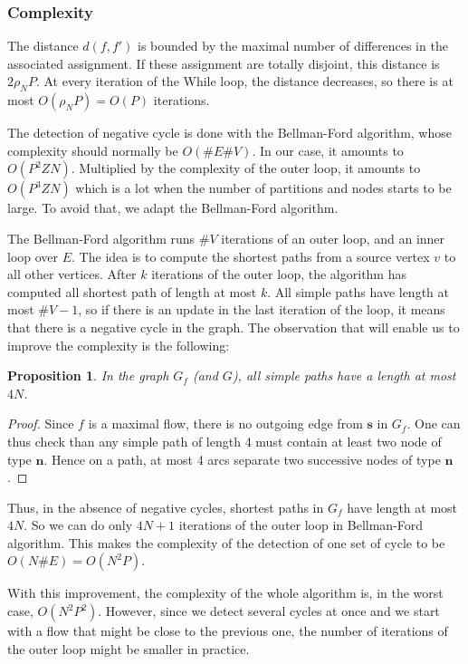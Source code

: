 \documentclass[]{article}
\newtheorem{proposition}{Proposition}
\begin{document}
\subsubsection*{Complexity}
The distance $d(f,f')$ is bounded by the maximal number of differences in the associated assignment. If these assignment are totally disjoint, this distance is $2\rho_N P$. At every iteration of the While loop, the distance decreases, so there is at most $O(\rho_N P) = O(P)$ iterations.

The detection of negative cycle is done with the Bellman-Ford algorithm, whose complexity should normally be $O(\#E\#V)$. In our case, it amounts to $O(P^2ZN)$. Multiplied by the complexity of the outer loop, it amounts to $O(P^3ZN)$ which is a lot when the number of partitions and nodes starts to be large. To avoid that, we adapt the Bellman-Ford algorithm.

The Bellman-Ford algorithm runs $\#V$ iterations of an outer loop, and an inner loop over $E$. The idea is to compute the shortest paths from a source vertex $v$ to all other vertices. After $k$ iterations of the outer loop, the algorithm has computed all shortest path of length at most $k$. All simple paths have length at most $\#V-1$, so if there is an update in the last iteration of the loop, it means that there is a negative cycle in the graph. The observation that will enable us to improve the complexity is the following:

\begin{proposition}
	In the graph $G_f$ (and $G$), all simple paths have a length at most $4N$.
\end{proposition}
\begin{proof}
	Since $f$ is a maximal flow, there is no outgoing edge from $\mathbf{s}$ in $G_f$. One can thus check than any simple path of length 4 must contain at least two node of type $\mathbf{n}$. Hence on a path, at most 4 arcs separate two successive nodes of type $\mathbf{n}$. 
\end{proof}

Thus, in the absence of negative cycles, shortest paths in $G_f$ have length at most $4N$. So we can do only $4N+1$ iterations of the outer loop in Bellman-Ford algorithm. This makes the complexity of the detection of one set of cycle to be $O(N\#E) = O(N^2 P)$.

With this improvement, the complexity of the whole algorithm is, in the worst case, $O(N^2P^2)$. However, since we detect several cycles at once and we start with a flow that might be close to the previous one, the number of iterations of the outer loop might be smaller in practice.
\end{document}
